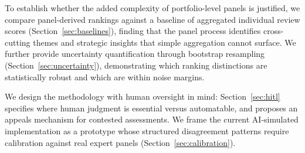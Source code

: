 To establish whether the added complexity of portfolio-level panels is justified, we compare panel-derived rankings against a baseline of aggregated individual review scores (Section~\ref{sec:baselines}), finding that the panel process identifies cross-cutting themes and strategic insights that simple aggregation cannot surface. We further provide uncertainty quantification through bootstrap resampling (Section~\ref{sec:uncertainty}), demonstrating which ranking distinctions are statistically robust and which are within noise margins.

We design the methodology with human oversight in mind: Section~\ref{sec:hitl} specifies where human judgment is essential versus automatable, and proposes an appeals mechanism for contested assessments. We frame the current AI-simulated implementation as a prototype whose structured disagreement patterns require calibration against real expert panels (Section~\ref{sec:calibration}).
